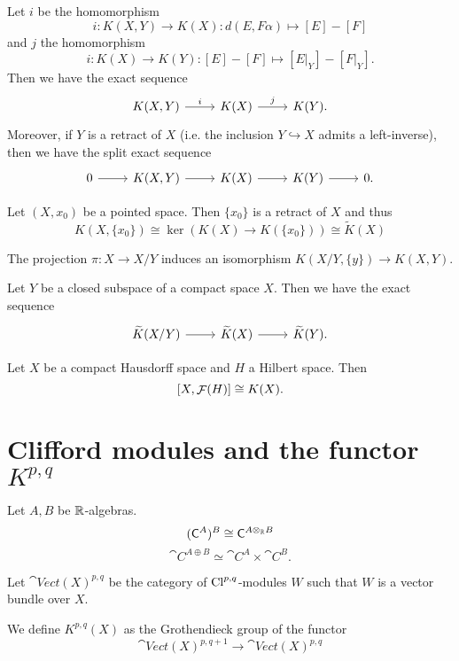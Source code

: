 \begin{proposition}
Let $i$ be the homomorphism
\[ i:K(X,Y)\to K(X): d(E,F\alpha) \mapsto [E]-[F] \]
and $j$ the homomorphism
\[ i:K(X)\to K(Y): [E]-[F] \mapsto [E|_Y]-[F|_Y]. \]
Then we have the exact sequence
\[ \begin{tikzcd}
K(X,Y) \rar{i} & K(X) \rar{j} & K(Y).
\end{tikzcd} \]
Moreover, if $Y$ is a retract of $X$ (i.e. the inclusion $Y\hookrightarrow X$ admits a left-inverse), then we have the split exact sequence
\[ \begin{tikzcd}
0 \rar & K(X,Y) \rar & K(X) \rar & K(Y) \rar & 0.
\end{tikzcd} \]
\end{proposition}
\begin{corollary}
Let $(X,x_0)$ be a pointed space. Then $\{x_0\}$ is a retract of $X$ and thus
\[ K(X, \{x_0\}) \cong \ker(K(X)\to K(\{x_0\})) \cong \widetilde{K}(X) \]
\end{corollary}

\begin{proposition}
The projection $\pi: X\to X/Y$ induces an isomorphism $K(X/Y,\{y\}) \to K(X,Y)$.
\end{proposition}

\begin{proposition}
Let $Y$ be a closed subspace of a compact space $X$. Then we have the 
exact sequence 
\[ \begin{tikzcd}
\widetilde{K}(X/Y) \rar & \widetilde{K}(X) \rar & \widetilde{K}(Y).
\end{tikzcd} \]
\end{proposition}

\begin{theorem}
Let $X$ be a compact Hausdorff space and $H$ a Hilbert space. Then
\[ [X,\mathop{\mathcal{F}}(H)] \cong K(X). \]
\end{theorem}

\section{Clifford modules and the functor $K^{p,q}$}
\begin{proposition}
Let $A,B$ be $\mathbb{R}$-algebras. 
\[ (\mathsf{C}^A)^B \cong \mathsf{C}^{A\otimes_{\mathbb{R}} B} \]
\[ \cat{C}^{A\oplus B}\simeq \cat{C}^A\times \cat{C}^B. \]
\end{proposition}

\begin{definition}
Let $\cat{Vect}(X)^{p,q}$ be the category of $\operatorname{Cl}^{p,q}$-modules $W$ such that $W$ is a vector bundle over $X$.

We define $K^{p,q}(X)$ as the Grothendieck group of the functor
\[ \cat{Vect}(X)^{p,q+1}\to \cat{Vect}(X)^{p,q}  \]
\end{definition}

